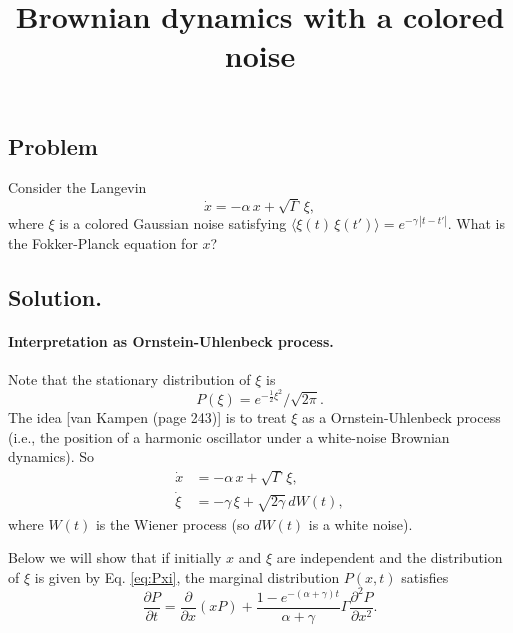 \documentclass{article}
\begin{document}
\title{Brownian dynamics with a colored noise}
\author{ \vspace{-10ex} }
\date{ \vspace{-10ex} }
\maketitle

\subsection*{Problem}
Consider the Langevin
$$
\dot x = -\alpha \, x + \sqrt{\Gamma} \, \xi,
$$
where $\xi$ is a colored Gaussian noise satisfying
$\langle \xi(t) \, \xi(t') \rangle = e^{-\gamma \, |t-t'|}$.
What is the Fokker-Planck equation for $x$?

\subsection*{Solution.}

\paragraph{Interpretation as Ornstein-Uhlenbeck process.}

Note that the stationary distribution of $\xi$ is
\begin{equation}
P(\xi) = e^{-\frac{1}{2}\xi^2}/\sqrt{2\pi}.
\label{eq:Pxi}
\end{equation}
%
The idea [van Kampen (page 243)] is
to treat $\xi$ as a Ornstein-Uhlenbeck process
(i.e., the position of a harmonic oscillator under
a white-noise Brownian dynamics).
%
So
\begin{equation}
  \begin{aligned}
    \dot x &= -\alpha \, x + \sqrt{\Gamma} \, \xi, \\
    \dot \xi &= -\gamma \, \xi + \sqrt{2 \gamma} \, d W(t),
  \end{aligned}
  \label{eq:ho_colorednoise_x}
\end{equation}
where $W(t)$ is the Wiener process (so $dW(t)$ is a white noise).

Below we will show that
if initially $x$ and $\xi$ are independent
and the distribution of $\xi$ is given by Eq. \eqref{eq:Pxi},
the marginal distribution $P(x, t)$ satisfies
\begin{equation}
\frac{ \partial P } { \partial t } = \frac{ \partial } { \partial x } (x P)
+
\frac{ 1 - e^{-(\alpha+\gamma) t} } {\alpha + \gamma} \Gamma
\frac{ \partial^2 P } { \partial x^2 }.
\label{eq:ho_colorednoise_Px}
\end{equation}
\end{document}
